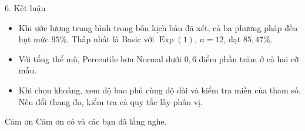 \documentclass[aspectratio=43,10pt]{beamer}
\begin{document}
\begin{frame}{6. Kết luận}
    \begin{itemize}
        \item Khi ước lượng trung bình trong bốn kịch bản đã xét, cả ba phương pháp đều hụt mức $95\%$. Thấp nhất là Basic với $\operatorname{Exp}(1)$, $n=12$, đạt $85{,}47\%$.
        \item Với tổng thể mũ, Percentile hơn Normal dưới $0{,}6$ điểm phần trăm ở cả hai cỡ mẫu.
        \item Khi chọn khoảng, xem độ bao phủ cùng độ dài và kiểm tra miền của tham số. Nếu đổi thang đo, kiểm tra cả quy tắc lấy phân vị.
    \end{itemize}
\end{frame}

\begin{frame}{Cảm ơn}
    \centering\Large Cảm ơn cô và các bạn đã lắng nghe.
\end{frame}
\end{document}
